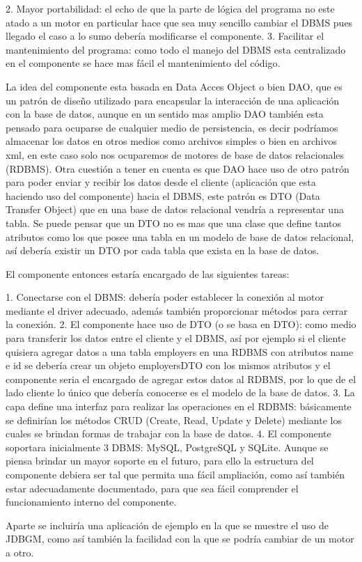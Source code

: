 2. Mayor portabilidad: el echo de que la parte de lógica del programa no este atado a un motor en particular hace que sea muy sencillo cambiar el DBMS pues llegado el caso a lo sumo debería modificarse el componente.
3. Facilitar el mantenimiento del programa: como todo el manejo del DBMS esta centralizado en el componente se hace mas fácil el mantenimiento del código.

La idea del componente esta basada en Data Acces Object o bien DAO, que es un patrón de diseño utilizado para encapsular la interacción de una aplicación con la base de datos, aunque en un sentido mas amplio DAO también esta pensado para ocuparse de cualquier medio de persistencia, es decir podríamos almacenar los datos en otros medios como archivos simples o bien en archivos xml, en este caso solo nos ocuparemos de motores de base de datos relacionales (RDBMS). Otra cuestión a tener en cuenta es que DAO hace uso de otro patrón para poder enviar y recibir los datos desde el cliente (aplicación que esta haciendo uso del componente) hacia el DBMS, este patrón es DTO  (Data Transfer Object) que en una base de datos relacional vendría a representar una tabla. Se puede pensar que un DTO no es mas que una clase que define tantos atributos como los que posee una tabla en un  modelo de base de datos relacional, así debería existir un DTO por cada tabla que exista en la    base de datos. 

El componente entonces estaría encargado de las siguientes tareas:

1. Conectarse con el DBMS: debería poder establecer la conexión al motor mediante el driver adecuado, además también proporcionar métodos para cerrar la conexión.
2. El componente hace uso de DTO (o se basa en DTO): como medio para transferir los datos entre el cliente y el DBMS, así por ejemplo si el cliente quisiera agregar datos a una tabla employers en una RDBMS con atributos name e id se debería crear un objeto employersDTO con los mismos atributos y  el componente seria el encargado de agregar estos datos al RDBMS, por lo que de el lado cliente lo único que debería conocerse es el modelo de la base de datos.
3. La capa define una interfaz para realizar las operaciones en el RDBMS: básicamente se definirían los métodos CRUD (Create, Read, Update y Delete) mediante los cuales se brindan formas de trabajar con la base de datos.
4. El componente soportara inicialmente 3 DBMS: MySQL, PostgreSQL y SQLite. Aunque se piensa brindar un mayor soporte en el futuro, para ello la estructura del componente debiera ser tal que permita una fácil ampliación, como así también estar adecuadamente documentado, para que sea fácil comprender el funcionamiento interno del componente.

Aparte se incluiría una aplicación de ejemplo en la que se muestre el uso de JDBGM, como así también la facilidad con la que se podría cambiar de un motor a otro.  



